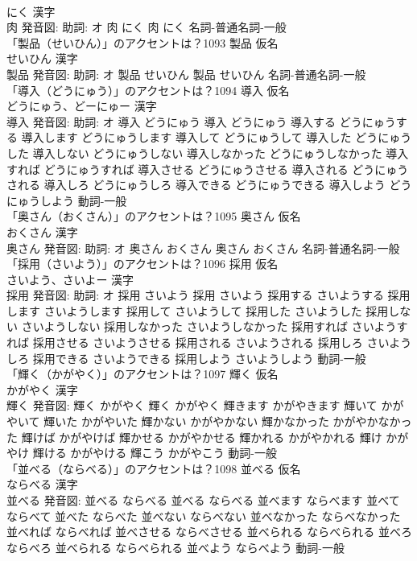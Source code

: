\documentclass[8pt]{extreport}
\begin{document}
\begin{CJK}{UTF8}{min}
\\	にく 漢字　
\\	肉 発音図: 助詞: オ	肉 にく		肉 にく				名詞-普通名詞-一般 
\\	「製品（せいひん）」のアクセントは？1093	製品 仮名　
\\	せいひん 漢字　
\\	製品 発音図: 助詞: オ	製品 せいひん		製品 せいひん				名詞-普通名詞-一般 
\\	「導入（どうにゅう）」のアクセントは？1094	導入 仮名　
\\	どうにゅう、どーにゅー 漢字　
\\	導入 発音図: 助詞: オ	導入 どうにゅう		導入 どうにゅう 導入する どうにゅうする 導入します どうにゅうします 導入して どうにゅうして 導入した どうにゅうした 導入しない どうにゅうしない 導入しなかった どうにゅうしなかった 導入すれば どうにゅうすれば 導入させる どうにゅうさせる 導入される どうにゅうされる 導入しろ どうにゅうしろ 導入できる どうにゅうできる 導入しよう どうにゅうしよう				動詞-一般 
\\	「奥さん（おくさん）」のアクセントは？1095	奥さん 仮名　
\\	おくさん 漢字　
\\	奥さん 発音図: 助詞: オ	奥さん おくさん		奥さん おくさん				名詞-普通名詞-一般 
\\	「採用（さいよう）」のアクセントは？1096	採用 仮名　
\\	さいよう、さいよー 漢字　
\\	採用 発音図: 助詞: オ	採用 さいよう		採用 さいよう 採用する さいようする 採用します さいようします 採用して さいようして 採用した さいようした 採用しない さいようしない 採用しなかった さいようしなかった 採用すれば さいようすれば 採用させる さいようさせる 採用される さいようされる 採用しろ さいようしろ 採用できる さいようできる 採用しよう さいようしよう				動詞-一般 
\\	「輝く（かがやく）」のアクセントは？1097	輝く 仮名　
\\	かがやく 漢字　
\\	輝く 発音図:	輝く かがやく		輝く かがやく 輝きます かがやきます 輝いて かがやいて 輝いた かがやいた 輝かない かがやかない 輝かなかった かがやかなかった 輝けば かがやけば 輝かせる かがやかせる 輝かれる かがやかれる 輝け かがやけ 輝ける かがやける 輝こう かがやこう				動詞-一般 
\\	「並べる（ならべる）」のアクセントは？1098	並べる 仮名　
\\	ならべる 漢字　
\\	並べる 発音図:	並べる ならべる		並べる ならべる 並べます ならべます 並べて ならべて 並べた ならべた 並べない ならべない 並べなかった ならべなかった 並べれば ならべれば 並べさせる ならべさせる 並べられる ならべられる 並べろ ならべろ 並べられる ならべられる 並べよう ならべよう				動詞-一般 

\end{CJK}
\end{document}
